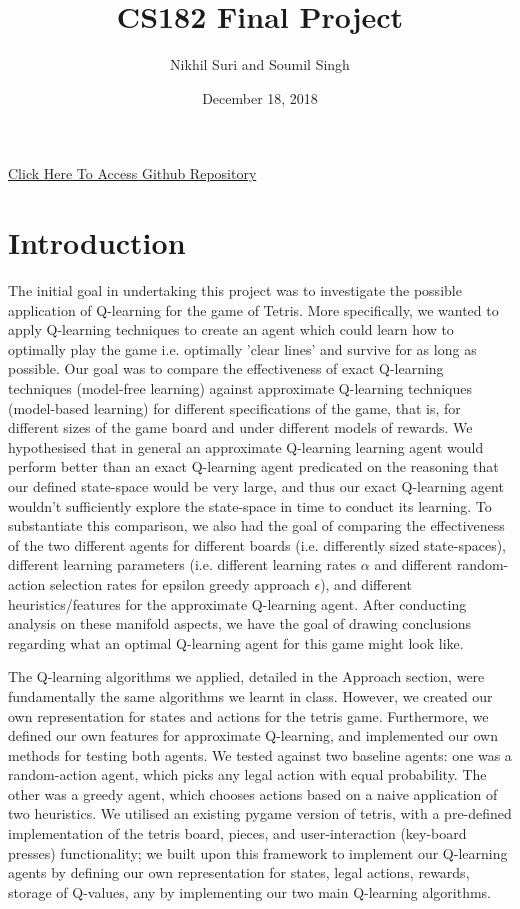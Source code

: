 \documentclass[10pt]{article}
\title{CS182 Final Project}
\author{Nikhil Suri and Soumil Singh}
\date{December 18, 2018}
\begin{document}
\maketitle{}

\begin{center}
    \href{https://github.com/RealDealNikhil/tetris-agent}{Click Here To Access Github Repository}
\end{center}

\section{Introduction}
The initial goal in undertaking this project was to investigate the possible application of Q-learning for the game of Tetris. More specifically, we wanted to apply Q-learning techniques to create an agent which could learn how to optimally play the game i.e. optimally 'clear lines' and survive for as long as possible. Our goal was to compare the effectiveness of exact Q-learning techniques (model-free learning) against approximate Q-learning techniques (model-based learning) for different specifications of the game, that is, for different sizes of the game board and under different models of rewards. We hypothesised that in general an approximate Q-learning learning agent would perform better than an exact Q-learning agent predicated on the reasoning that our defined state-space would be very large, and thus our exact Q-learning agent wouldn't sufficiently explore the state-space in time to conduct its learning. To substantiate this comparison, we also had the goal of comparing the effectiveness of the two different agents for different boards (i.e. differently sized state-spaces), different learning parameters (i.e. different learning rates $\alpha$ and different random-action selection rates for epsilon greedy approach $\epsilon$), and different heuristics/features for the approximate Q-learning agent. After conducting analysis on these manifold aspects, we have the goal of drawing conclusions regarding what an optimal Q-learning agent for this game might look like.

The Q-learning algorithms we applied, detailed in the Approach section, were fundamentally the same algorithms we learnt in class. However, we created our own representation for states and actions for the tetris game. Furthermore, we defined our own features for approximate Q-learning, and implemented our own methods for testing both agents. We tested against two baseline agents: one was a random-action agent, which picks any legal action with equal probability. The other was a greedy agent, which chooses actions based on a naive application of two heuristics. We utilised an existing pygame version of tetris, with a pre-defined implementation of the tetris board, pieces, and user-interaction (key-board presses) functionality; we built upon this framework to implement our Q-learning agents by defining our own representation for states, legal actions, rewards, storage of Q-values, any by implementing our two main Q-learning algorithms.
\end{document}

